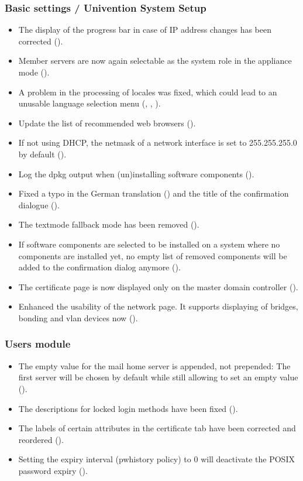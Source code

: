 \subsubsection{Basic settings / Univention System Setup}
\begin{itemize}
\item The display of the progress bar in case of IP address changes
  has been corrected ().
\item Member servers are now again selectable as the system role in
  the appliance mode ().
\item A problem in the processing of locales was fixed, which could
  lead to an unusable language selection menu (,
  , ).
\item Update the list of recommended web browsers ().
\item If not using DHCP, the netmask of a network interface is set to
  255.255.255.0 by default ().
\item Log the dpkg output when (un)installing software components ().
\item Fixed a typo in the German translation () and the
  title of the confirmation dialogue ().
\item The textmode fallback mode has been removed ().
\item If software components are selected to be installed on a system
  where no components are installed yet, no empty list of removed
  components will be added to the confirmation dialog anymore
  ().
\item The certificate page is now displayed only on the master domain
  controller ().
\item Enhanced the usability of the network page. It supports displaying of bridges, bonding and vlan devices now ().
\end{itemize}

\subsubsection{Users module}
\begin{itemize}
\item The empty value for the mail home server is appended, not
  prepended: The first server will be chosen by default while still
  allowing to set an empty value ().
\item The descriptions for locked login methods have been fixed
  ().
\item The labels of certain attributes in the certificate tab have
  been corrected and reordered ().
\item Setting the expiry interval (pwhistory policy) to 0 will
  deactivate the POSIX password expiry ().
\end{itemize}


